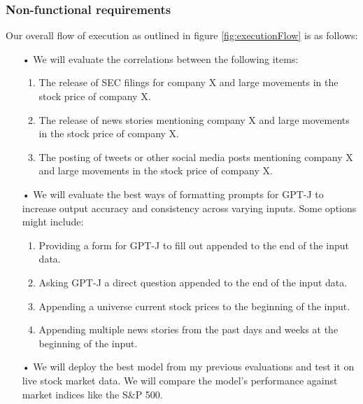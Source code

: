 \documentclass[conference]{IEEEtran}
\begin{document}
\subsubsection{Non-functional requirements}
Our overall flow of execution as outlined in figure \ref{fig:executionFlow} is as follows:
\begin{enumerate}
	\item[•] We will evaluate the correlations between the following items:
	      \begin{enumerate}
	      	\item The release of SEC filings for company X and large movements in the stock price of company X.
	      	\item The release of news stories mentioning company X and large movements in the stock price of company X.
	      	\item The posting of tweets or other social media posts mentioning company X and large movements in the stock price of company X.
	      \end{enumerate}
	\item[•] We will evaluate the best ways of formatting prompts for GPT-J to increase output accuracy and consistency across varying inputs. Some options might include:
	      \begin{enumerate}
	      	\item Providing a form for GPT-J to fill out appended to the end of the input data.
	      	\item Asking GPT-J a direct question appended to the end of the input data.
	      	\item Appending a universe current stock prices to the beginning of the input.
	      	\item Appending multiple news stories from the past days and weeks at the beginning of the input.
	      \end{enumerate}
	\item[•] We will deploy the best model from my previous evaluations and test it on live stock market data. We will compare the model's performance against market indices like the S\&P 500. 
\end{enumerate}
\end{document}
